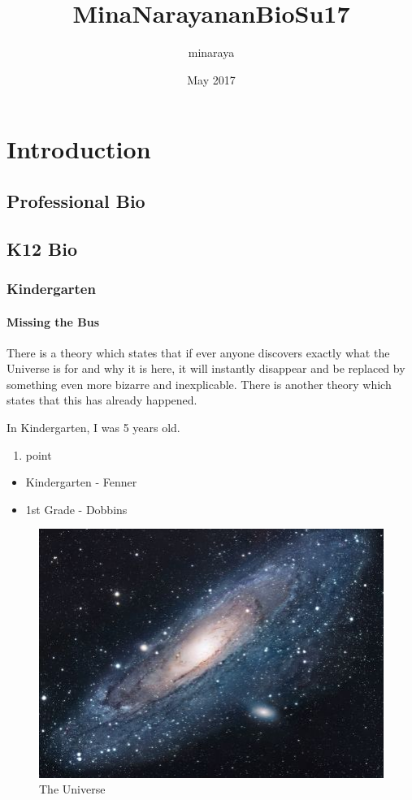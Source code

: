 \documentclass{article}
\title{MinaNarayananBioSu17}
\author{minaraya }
\date{May 2017}
\begin{document}
\maketitle

\section{Introduction}
\subsection{Professional Bio}
\subsection{K12 Bio}
\subsubsection{Kindergarten}
\paragraph{Missing the Bus}
    
There is a theory which states that if ever anyone discovers exactly what the Universe is for and why it is here, it will instantly disappear and be replaced by something even more bizarre and inexplicable.
There is another theory which states that this has already happened.

In Kindergarten, I was 5 years old.

\begin{enumerate}
\item point
\end{enumerate}


\begin{itemize}
    \item Kindergarten - Fenner
    \item 1st Grade - Dobbins
\end{itemize}

\begin{figure}[b]
\centering
\includegraphics[scale=1.7]{universe.jpg}
\caption{The Universe}
\label{fig:universe}
\end{figure}
\end{document}

